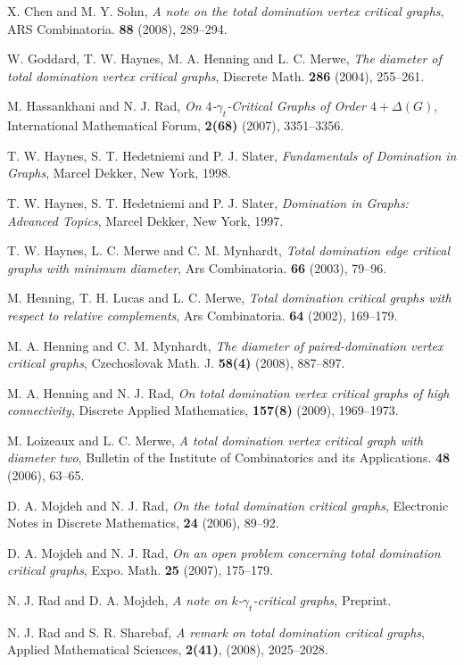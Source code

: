\documentclass[12pt]{amsart}
\begin{document}
\begin{thebibliography}{99}

 X. Chen and M. Y. Sohn, \textit{A note on the total domination vertex critical graphs}, ARS Combinatoria.
   {\bf 88} (2008), 289--294.

 W. Goddard, T. W. Haynes, M. A. Henning and L. C. Merwe,
\textit{The diameter of total domination vertex critical graphs},
Discrete Math. {\bf 286} (2004), 255--261.

 M. Hassankhani and N. J. Rad,  \textit{On $4$-$\gamma_t$-Critical Graphs
of Order $4 +\Delta(G)$}, International Mathematical Forum, {\bf 2(68)} (2007), 3351--3356.

 T. W. Haynes, S. T. Hedetniemi and P. J. Slater,  \textit{Fundamentals of Domination in Graphs}, Marcel Dekker, New York, 1998.

 T. W. Haynes, S. T. Hedetniemi and P. J. Slater, \textit{Domination in Graphs: Advanced Topics}, Marcel Dekker, New York, 1997.

 T. W. Haynes, L. C. Merwe and C. M. Mynhardt,
\textit{Total domination edge critical graphs with minimum diameter}, Ars Combinatoria. {\bf 66} (2003),
79--96.

 M. Henning, T. H. Lucas and L. C. Merwe,
\textit{Total domination critical graphs with respect to relative complements},
Ars Combinatoria. {\bf 64} (2002), 169--179.

 M. A. Henning and C. M. Mynhardt, \textit{The diameter of paired-domination vertex critical graphs},
Czechoslovak Math. J. {\bf 58(4)} (2008), 887--897.

 M. A. Henning and N. J. Rad,
\textit{On total domination vertex critical graphs of high connectivity},
Discrete Applied Mathematics, {\bf 157(8)} (2009), 1969--1973.

 M. Loizeaux and L. C. Merwe, \textit{A total domination vertex critical graph with diameter two},
Bulletin of the Institute of Combinatorics
and its Applications. {\bf 48} (2006), 63--65.

 D. A. Mojdeh and N. J. Rad,  \textit{On the total domination critical graphs},
 Electronic Notes in Discrete Mathematics,  {\bf 24} (2006), 89--92.

 D. A. Mojdeh and N. J. Rad, \textit{On an open problem concerning total
domination critical graphs}, Expo. Math. {\bf 25} (2007), 175--179.

 N. J. Rad and D. A. Mojdeh,  \textit{A note on $k$-$\gamma_{t}$-critical graphs},
 Preprint.

 N. J. Rad and S. R. Sharebaf, \textit{A remark on total domination critical graphs},
Applied Mathematical Sciences, {\bf 2(41)}, (2008), 2025--2028.

\end{thebibliography}
\end{document}
